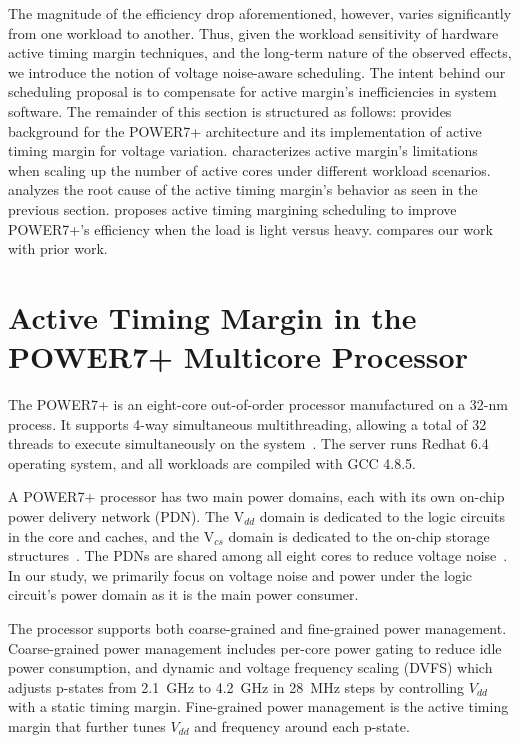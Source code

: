 The magnitude of the efficiency drop aforementioned, however, varies significantly from one workload to another. Thus, given the workload sensitivity of hardware active timing margin techniques, and the long-term nature of the observed effects, we introduce the notion of voltage noise-aware scheduling. The intent behind our scheduling proposal is to compensate for active margin's inefficiencies in system software. The remainder of this section is structured as follows:  provides background for the POWER7+ architecture and its implementation of active timing margin for voltage variation.  characterizes active margin's limitations when scaling up the number of active cores under different workload scenarios.  analyzes the root cause of the active timing margin's behavior as seen in the previous section.  proposes active timing margining scheduling to improve POWER7+'s efficiency when the load is light versus heavy.  compares our work with prior work.

\section{Active Timing Margin in the POWER7+ Multicore Processor}
\label{sec:voltage:background}

The POWER7+ is an eight-core out-of-order processor manufactured on a 32-nm process. It supports 4-way simultaneous multithreading, allowing a total of 32 threads to execute simultaneously on the system~\cite{manousopoulos2012characterizing}. The server runs Redhat 6.4 operating system, and all workloads are compiled with GCC 4.8.5.

A POWER7+ processor has two main power domains, each with its own on-chip power delivery network (PDN). The V$_{dd}$ domain is dedicated to the logic circuits in the core and caches, and the V$_{cs}$ domain is dedicated to the on-chip storage structures~\cite{zyuban2013ibm,barth201045nm}. The PDNs are shared among all eight cores to reduce voltage noise~\cite{james2007comparison}. In our study, we primarily focus on voltage noise and power under the logic circuit's power domain as it is the main power consumer.

The processor supports both coarse-grained and fine-grained power management. Coarse-grained power management includes per-core power gating to reduce idle power consumption, and dynamic and voltage frequency scaling (DVFS) which adjusts p-states from 2.1~GHz to 4.2~GHz in 28~MHz steps by controlling $V_{dd}$ with a static timing margin. Fine-grained power management is the active timing margin that further tunes $V_{dd}$ and frequency around each p-state.

